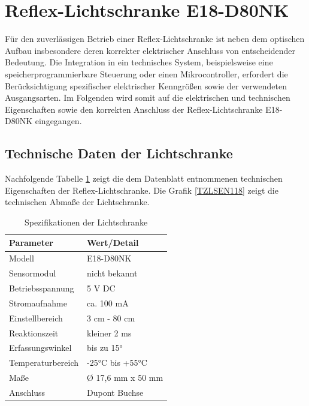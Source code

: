 \section{Reflex-Lichtschranke E18-D80NK}
Für den zuverlässigen Betrieb einer Reflex-Lichtschranke ist neben dem optischen Aufbau insbesondere deren korrekter elektrischer Anschluss von entscheidender Bedeutung. Die Integration in ein technisches System, beispielsweise eine speicherprogrammierbare Steuerung oder einen Mikrocontroller, erfordert die Berücksichtigung spezifischer elektrischer Kenngrößen sowie der verwendeten Ausgangsarten. Im Folgenden wird somit auf die elektrischen und technischen Eigenschaften sowie den korrekten  Anschluss der Reflex-Lichtschranke E18-D80NK eingegangen. 
	\subsection{Technische Daten der Lichtschranke } 
	Nachfolgende Tabelle \ref{TabelleSpezifikationLS} 
	zeigt die dem Datenblatt \cite{Roboter-Bausatz:2026} entnommenen technischen Eigenschaften der Reflex-Lichtschranke.
	Die Grafik  \ref{TZLSEN118} zeigt die technischen Abmaße der Lichtschranke.  
\begin{table}[h!]
	\caption{Spezifikationen der Lichtschranke \cite{Roboter-Bausatz:2026}}
	\begin{center}
		\begin{tabular}{|l|l|}
			\hline
			\textbf{Parameter} &\textbf{Wert/Detail}\\
			\hline
			Modell &  E18-D80NK\\
			\hline
			Sensormodul & nicht bekannt \\
			\hline 
			Betriebsspannung & 5 V DC\\
			\hline
			Stromaufnahme & ca. 100 mA\\
			\hline
			Einstellbereich & 3 cm - 80 cm\\
			\hline
			Reaktionszeit & kleiner 2 ms\\
			\hline
			Erfassungswinkel & bis zu 15°\\
			\hline
			Temperaturbereich & -25°C bis +55°C\\
			\hline
			Maße & Ø 17,6 mm x 50 mm\\
			\hline
			Anschluss & Dupont Buchse\\ 
			\hline
		\end{tabular}
	\label{TabelleSpezifikationLS}
	\end{center}
\end{table} 



